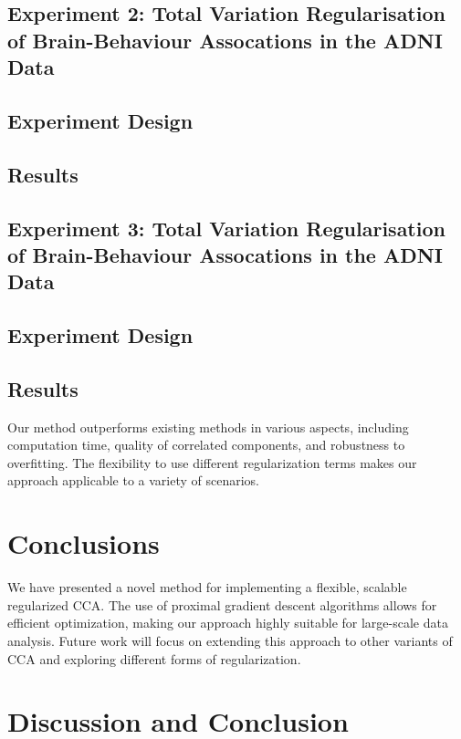 \subsection{Experiment 2: Total Variation Regularisation of Brain-Behaviour Assocations in the ADNI Data}

\subsection{Experiment Design}

\subsection{Results}

\subsection{Experiment 3: Total Variation Regularisation of Brain-Behaviour Assocations in the ADNI Data}

\subsection{Experiment Design}

\subsection{Results}
Our method outperforms existing methods in various aspects, including computation time, quality of correlated components, and robustness to overfitting.
The flexibility to use different regularization terms makes our approach applicable to a variety of scenarios.


\section{Conclusions}
We have presented a novel method for implementing a flexible, scalable regularized CCA. The use of proximal gradient descent algorithms allows for efficient optimization, making our approach highly suitable for large-scale data analysis.
Future work will focus on extending this approach to other variants of CCA and exploring different forms of regularization.


\section{Discussion and Conclusion}



